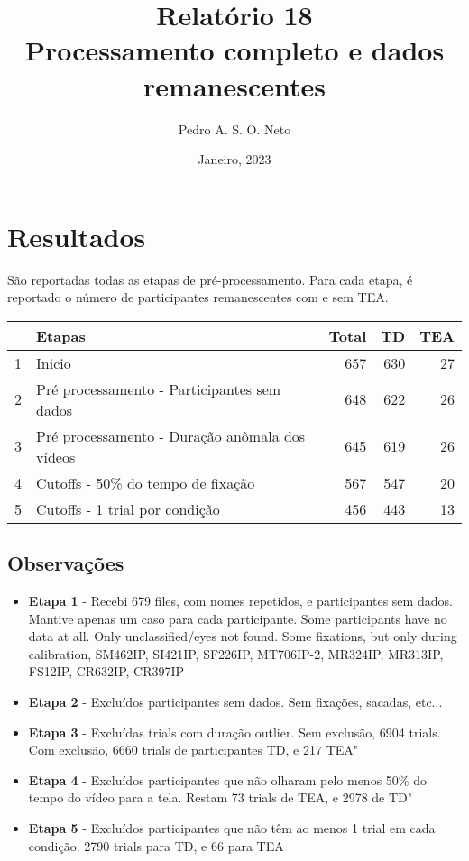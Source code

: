 \documentclass{article}
\title{Relatório 18 \\ Processamento completo e dados remanescentes}
\author{Pedro A. S. O. Neto}
\date{Janeiro, 2023}
\begin{document}
\maketitle

\section{Resultados}

São reportadas todas as etapas de pré-processamento. Para cada etapa, é reportado o número de participantes remanescentes com e sem TEA.

\begin{table}[ht]
\centering
\begin{tabular}{rlrrr}
  \hline
 & Etapas & Total & TD & TEA \\
  \hline
1 & Inicio & 657 & 630 &  27 \\
  2 & Pré processamento - Participantes sem dados & 648 & 622 &  26 \\
  3 & Pré processamento - Duração anômala dos vídeos & 645 & 619 &  26 \\
  4 & Cutoffs - 50\% do tempo de fixação & 567 & 547 &  20 \\
  5 & Cutoffs - 1 trial por condição & 456 & 443 &  13 \\
   \hline
\end{tabular}
\end{table}

\subsection{Observações}

\begin{itemize}
  \item \textbf{Etapa 1} - Recebi 679 files, com nomes repetidos, e participantes sem dados. Mantive apenas um caso para cada participante. Some participants have no data at all. Only unclassified/eyes not found. Some fixations, but only during calibration, SM462IP, SI421IP, SF226IP, MT706IP-2, MR324IP, MR313IP, FS12IP, CR632IP, CR397IP
  \item \textbf{Etapa 2} - Excluídos participantes sem dados. Sem fixações, sacadas, etc...
  \item \textbf{Etapa 3} - Excluídas trials com duração outlier. Sem exclusão, 6904 trials. Com exclusão, 6660 trials de participantes TD, e 217 TEA"
  \item \textbf{Etapa 4} - Excluídos participantes que não olharam pelo menos 50\% do tempo do vídeo para a tela. Restam 73 trials de TEA, e 2978 de TD"
  \item \textbf{Etapa 5} - Excluídos participantes que não têm ao menos 1 trial em cada condição. 2790 trials para TD, e 66 para TEA
\end{itemize}
\end{document}
